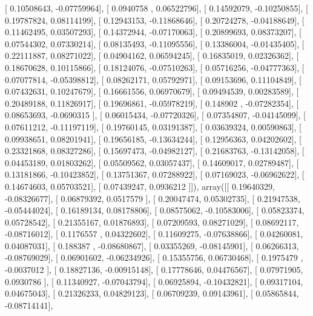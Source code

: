 \documentclass{article}
\begin{document}
       [ 0.10508643, -0.07759964],
       [ 0.0940758 ,  0.06522796],
       [ 0.14592079, -0.10250855],
       [ 0.19787824,  0.08114199],
       [ 0.12943153, -0.11868646],
       [ 0.20724278, -0.04188649],
       [ 0.11462495,  0.03507293],
       [ 0.14372944, -0.07170063],
       [ 0.20899693,  0.08373207],
       [ 0.07544302,  0.07330214],
       [ 0.08135493, -0.11095556],
       [ 0.13386004, -0.01435405],
       [ 0.22111887,  0.08271022],
       [ 0.04904162,  0.06594245],
       [ 0.16835019,  0.02326362],
       [ 0.18670628,  0.10115866],
       [ 0.18124076, -0.07510263],
       [ 0.05716256, -0.04777363],
       [ 0.07077814, -0.05398812],
       [ 0.08262171,  0.05792971],
       [ 0.09153696,  0.11104849],
       [ 0.07432631,  0.10247679],
       [ 0.16661556,  0.06970679],
       [ 0.09494539,  0.00283589],
       [ 0.20489188,  0.11826917],
       [ 0.19696861, -0.05978219],
       [ 0.148902  , -0.07282354],
       [ 0.08653693, -0.0690315 ],
       [ 0.06015434, -0.07720326],
       [ 0.07354807, -0.04145099],
       [ 0.07611212, -0.11197119],
       [ 0.19760145,  0.03191387],
       [ 0.03639324,  0.00590863],
       [ 0.09938651,  0.08201941],
       [ 0.19656185, -0.13634244],
       [ 0.12956363,  0.04202602],
       [ 0.23321868,  0.08327286],
       [ 0.15697473, -0.04982127],
       [ 0.21683763, -0.13142058],
       [ 0.04453189,  0.01803262],
       [ 0.05509562,  0.03057437],
       [ 0.14609017,  0.02789487],
       [ 0.13181866, -0.10423852],
       [ 0.13751367,  0.07288922],
       [ 0.07169023, -0.06962622],
       [ 0.14674603,  0.05703521],
       [ 0.07439247,  0.0936212 ]]), array([[ 0.19640329, -0.08326677],
       [ 0.06879392,  0.0517579 ],
       [ 0.20047474,  0.05302735],
       [ 0.21947538, -0.05444024],
       [ 0.16189134,  0.08178806],
       [ 0.08575062, -0.10583006],
       [ 0.05823374,  0.05728542],
       [ 0.21355167,  0.01876893],
       [ 0.07209593,  0.08271029],
       [ 0.08692117, -0.08716012],
       [ 0.1176557 ,  0.04322602],
       [ 0.11609275, -0.07638866],
       [ 0.04260081,  0.04087031],
       [ 0.188387  , -0.08680867],
       [ 0.03355269, -0.08145901],
       [ 0.06266313, -0.08769029],
       [ 0.06901602, -0.06234926],
       [ 0.15355756,  0.06730468],
       [ 0.1975479 , -0.0037012 ],
       [ 0.18827136, -0.00915148],
       [ 0.17778646,  0.04476567],
       [ 0.07971905,  0.0930786 ],
       [ 0.11340927, -0.07043794],
       [ 0.06925894, -0.10432821],
       [ 0.09317104,  0.04675043],
       [ 0.21326233,  0.04829123],
       [ 0.06709239,  0.09143961],
       [ 0.05865844, -0.08714141],
\end{document}
